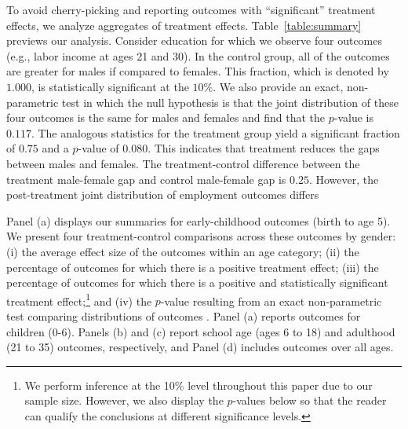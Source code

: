 To avoid cherry-picking and reporting outcomes with ``significant'' treatment effects, we analyze aggregates of treatment effects. Table~\ref{table:summary} previews our analysis. Consider education for which we observe four outcomes (e.g., labor income at ages 21 and 30). In the control group, all of the outcomes are greater for males if compared to females. This fraction, which is denoted by $1.000$, is statistically significant at the $10\%$. We also provide an exact, non-parametric test in which the null hypothesis is that the joint distribution of these four outcomes is the same for males and females and find that the $p$-value is $0.117$. The analogous statistics for the treatment group yield a significant fraction of $0.75$ and a $p$-value of $0.080$. This indicates that treatment reduces the gaps between males and females. The treatment-control difference between the treatment male-female gap and control male-female gap is $0.25$. However, the post-treatment joint distribution of employment outcomes differs 

Panel (a) displays our summaries for early-childhood outcomes (birth to age 5). We present four treatment-control comparisons across these outcomes by gender: (i) the average effect size of the outcomes within an age category; (ii) the percentage of outcomes for which there is a positive treatment effect; (iii) the percentage of outcomes for which there is a positive and statistically significant treatment effect;\footnote{We perform inference at the 10\% level throughout this paper due to our sample size. However, we also display the $p$-values below so that the reader can qualify the conclusions at different significance levels.} and (iv) the $p$-value resulting from an exact non-parametric test comparing distributions of outcomes \citep{Rosenbaum_2005_Distribution_JRSS}. Panel (a) reports outcomes for children (0-6). Panels (b) and (c) report school age (ages 6 to 18) and adulthood (21 to 35) outcomes, respectively, and Panel (d) includes outcomes over all ages.


